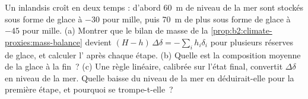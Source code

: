 \begin{exercise}[$\star\star\star$]\label{exo:b2:climate-proxies:12}
Un inlandsis croît en deux temps : d'abord \qty{60}{m} de niveau de la mer sont stockés sous forme de glace à $-30$ pour
mille, puis \qty{70}{m} de plus sous forme de glace à $-45$ pour mille. (a) Montrer que le bilan de masse de
la \cref{prop:b2:climate-proxies:mass-balance} devient $(H - h)\,\Delta\delta = -\sum_i h_i\delta_i$
pour plusieurs réserves de glace, et calculer l' après chaque étape. (b) Quelle est la
composition moyenne de la glace à la fin~? (c) Une règle linéaire, calibrée sur l'état final, convertit
$\Delta\delta$ en niveau de la mer. Quelle baisse du niveau de la mer en déduirait-elle pour la première étape, et pourquoi
se trompe-t-elle~?
\end{exercise}

